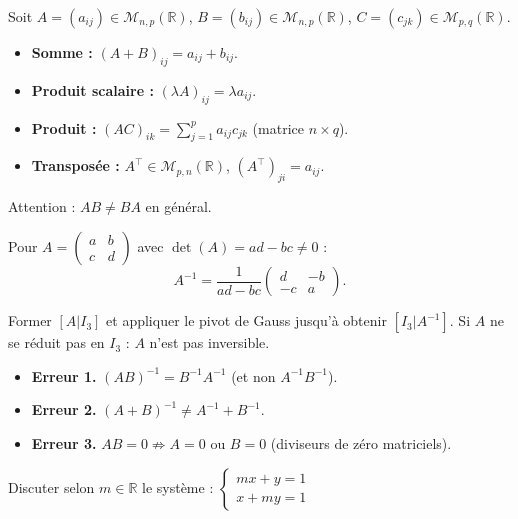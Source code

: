 \documentclass[11pt,a4paper,twoside]{book}
\newcommand{\R}{\mathbb{R}}
\begin{document}
\begin{definitionbox}
Soit $A=(a_{ij}) \in \mathcal{M}_{n,p}(\R)$, $B=(b_{ij}) \in \mathcal{M}_{n,p}(\R)$, $C=(c_{jk})\in\mathcal{M}_{p,q}(\R)$.
\begin{itemize}
  \item \textbf{Somme :} $(A+B)_{ij} = a_{ij}+b_{ij}$.
  \item \textbf{Produit scalaire :} $(\lambda A)_{ij} = \lambda a_{ij}$.
  \item \textbf{Produit :} $(AC)_{ik} = \sum_{j=1}^p a_{ij}c_{jk}$ (matrice $n\times q$).
  \item \textbf{Transposée :} $A^\top \in \mathcal{M}_{p,n}(\R)$, $(A^\top)_{ji}=a_{ij}$.
\end{itemize}
Attention : $AB \neq BA$ en général.
\end{definitionbox}

\begin{theoremebox}
Pour $A = \begin{pmatrix}a&b\\c&d\end{pmatrix}$ avec $\det(A)=ad-bc\neq 0$ :
\[
  A^{-1} = \frac{1}{ad-bc}\begin{pmatrix}d&-b\\-c&a\end{pmatrix}.
\]
\end{theoremebox}

\begin{methodebox}
Former $[A|I_3]$ et appliquer le pivot de Gauss jusqu'à obtenir $[I_3|A^{-1}]$.
Si $A$ ne se réduit pas en $I_3$ : $A$ n'est pas inversible.
\end{methodebox}

\begin{erreurbox}
\begin{itemize}
  \item \textbf{Erreur 1.} $(AB)^{-1} = B^{-1}A^{-1}$ (et non $A^{-1}B^{-1}$).
  \item \textbf{Erreur 2.} $(A+B)^{-1} \neq A^{-1}+B^{-1}$.
  \item \textbf{Erreur 3.} $AB=0 \not\Rightarrow A=0$ ou $B=0$ (diviseurs de zéro matriciels).
\end{itemize}
\end{erreurbox}

\begin{exercicebox}
Discuter selon $m\in\R$ le système :
$\begin{cases}mx + y = 1\\x + my = 1\end{cases}$
\end{exercicebox}
\end{document}
